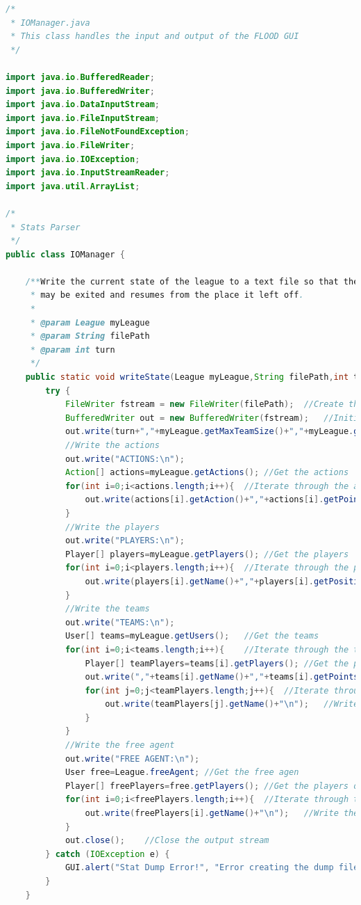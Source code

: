\documentclass[12pt]{report}
\begin{document}
\begin{singlespace}
\begin{lstlisting}[language=Java,label=some-code,caption={IOManager.java}]
/*
 * IOManager.java
 * This class handles the input and output of the FLOOD GUI
 */

import java.io.BufferedReader;
import java.io.BufferedWriter;
import java.io.DataInputStream;
import java.io.FileInputStream;
import java.io.FileNotFoundException;
import java.io.FileWriter;
import java.io.IOException;
import java.io.InputStreamReader;
import java.util.ArrayList;

/*
 * Stats Parser
 */
public class IOManager {
	
	/**Write the current state of the league to a text file so that the program
	 * may be exited and resumes from the place it left off.
	 * 
	 * @param League myLeague
	 * @param String filePath
	 * @param int turn
	 */
	public static void writeState(League myLeague,String filePath,int turn){
		try {
			FileWriter fstream = new FileWriter(filePath);	//Create the file
			BufferedWriter out = new BufferedWriter(fstream);	//Initialize the output stream
			out.write(turn+","+myLeague.getMaxTeamSize()+","+myLeague.getMinTeamSize()+","+myLeague.getMaxUser()+","+myLeague.getMinUser()+"\n");	//Write the first line of the file
			//Write the actions
			out.write("ACTIONS:\n");
			Action[] actions=myLeague.getActions();	//Get the actions
			for(int i=0;i<actions.length;i++){	//Iterate through the actions
				out.write(actions[i].getAction()+","+actions[i].getPoints()+"\n");	//Write each action
			}
			//Write the players
			out.write("PLAYERS:\n");
			Player[] players=myLeague.getPlayers();	//Get the players
			for(int i=0;i<players.length;i++){	//Iterate through the players
				out.write(players[i].getName()+","+players[i].getPosition()+","+players[i].getPoints()+"\n");	//Write each players
			}
			//Write the teams
			out.write("TEAMS:\n");
			User[] teams=myLeague.getUsers();	//Get the teams
			for(int i=0;i<teams.length;i++){	//Iterate through the teams
				Player[] teamPlayers=teams[i].getPlayers();	//Get the players of each team
				out.write(","+teams[i].getName()+","+teams[i].getPoints()+"\n");	//Write each team
				for(int j=0;j<teamPlayers.length;j++){	//Iterate through the players
					out.write(teamPlayers[j].getName()+"\n");	//Write the player's name as a reference to the above players
				}
			}
			//Write the free agent
			out.write("FREE AGENT:\n");
			User free=League.freeAgent;	//Get the free agen
			Player[] freePlayers=free.getPlayers();	//Get the players of the free agent
			for(int i=0;i<freePlayers.length;i++){	//Iterate through the players
				out.write(freePlayers[i].getName()+"\n");	//Write the player's name as a reference to the above players
			}
			out.close();	//Close the output stream
		} catch (IOException e) {
			GUI.alert("Stat Dump Error!", "Error creating the dump file! Please try again.");
		}
	}
	

\end{lstlisting}
\end{singlespace}
\end{document}

